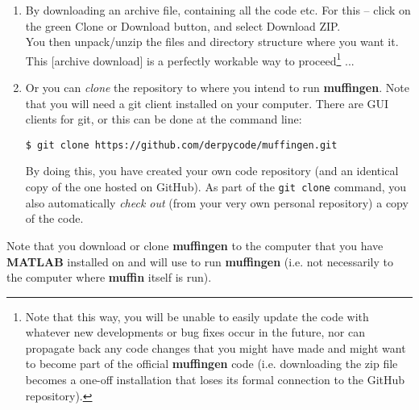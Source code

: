 \documentclass[11pt,fleqn]{book} %
\begin{document}
\vspace{2mm}
\begin{enumerate}

\vspace{1mm}
\item By downloading an archive file, containing all the code etc. For this -- click on the \textcolor[rgb]{0,0.501961,0}{green} \textsf{\small{Clone or Download}} button, and select \textsf{\small{Download ZIP}}.
\\You then unpack/unzip the files and directory structure where you want it.
\\This [archive download] is a perfectly workable way to proceed\footnote{Note that this way, you will be unable to easily update the code with whatever new developments or bug fixes occur in the future, nor can propagate back any code changes that you might have made and might want to become part of the official \textbf{muffingen} code  (i.e. downloading the \textsf{zip} file becomes a one-off installation that loses its formal connection to the GitHub repository).} ...

\vspace{1mm}
\item Or you can \textit{clone} the repository to where you intend to run \textbf{muffingen}. Note that you will need a git client installed on your computer. There are GUI clients for git, or this can be done at the command line:

\vspace{-2mm}
\begin{verbatim}
$ git clone https://github.com/derpycode/muffingen.git
\end{verbatim}
\vspace{-2mm}

By doing this, you have created your own code repository (and an identical copy of the one hosted on GitHub). As part of the \texttt{git clone} command, you also automatically \textit{check out} (from your very own personal repository) a copy of the code.

\end{enumerate}
\vspace{2mm}

Note that you download or clone \textbf{muffingen} to the computer that you have \textbf{MATLAB} installed on and will use to run \textbf{muffingen} (i.e. not necessarily to the computer where \textbf{muffin} itself is run).

\end{document}

